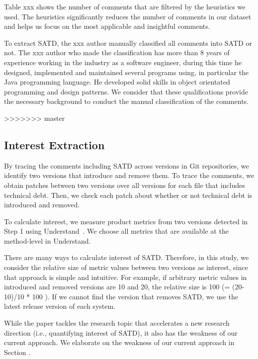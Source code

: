 \documentclass[conference]{IEEEtran}
\begin{document}
Table xxx shows the number of comments that are filtered by the heuristics we used. The heuristics significantly reduces the number of comments in our dataset and helps us focus on the most applicable and insightful comments. 


To extract SATD, the xxx author manually classified all comments into SATD or not.
The xxx author who made the classification has more than 8 years of experience working in the industry as a software engineer, during this time he designed, implemented and maintained several programs using, in particular the Java programming language. He developed solid skills in object orientated programming and design patterns. We consider that these qualifications provide the necessary background to conduct the manual classification of the comments.

>>>>>>> master
\subsection{Interest Extraction} \label{subsec:interest}

By tracing the comments including SATD across versions in Git repositories, we identify two versions that introduce and remove them. To trace the comments, we obtain patches between two versions over all versions for each file that includes technical debt. Then, we check each patch about whether or not technical debt is introduced and removed. 

To calculate interest, we measure product metrics from two versions detected in Step 1 using {\sc Understand}~\cite{Understand}. We choose all metrics that are available at the method-level in {\sc Understand}.

There are many ways to calculate interest of SATD. Therefore, in this study, we consider the relative size of metric values between two versions as interest, since that approach is simple and intuitive. For example, if arbitrary metric values in introduced and removed versions are 10 and 20, the relative size is 100 (= (20-10)/10 * 100 ).
If we cannot find the version that removes SATD, 
we use the latest release version of each system. 

While the paper tackles the research topic that accelerates a new research direction (i.e., quantifying interest of SATD), it also has the weakness of our current approach. We elaborate on the weakness of our current approach in Section .
\end{document}
